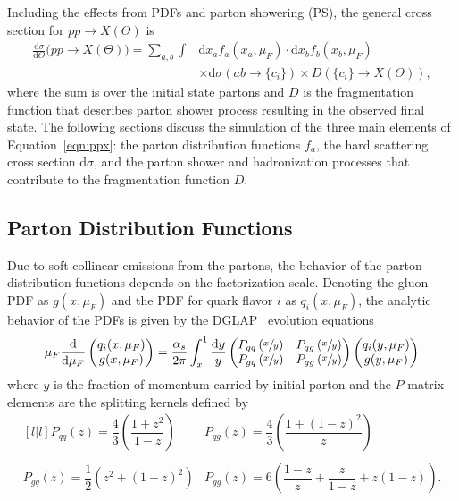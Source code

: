 Including the effects from PDFs and parton showering (PS), the general cross section for $pp \rightarrow X(\Theta)$ is
\begin{align}
  \label{eqn:ppx}
  \frac{\text{d}\sigma}{\text{d}\Theta} \Big(pp \rightarrow X(\Theta) \Big) =
  \sum_{a,b} \int & \text{d} x_a f_a(x_a, \mu_F) \cdot \text{d} x_b f_b(x_b, \mu_F)  \nonumber \\
  & \times \text{d}\sigma \left(ab \rightarrow \{c_i\} \right)
  \times D \left( \{c_i\} \rightarrow X(\Theta) \right), 
\end{align}
where the sum is over the initial state partons and $D$ is the fragmentation function that describes parton shower process resulting in the observed final state.
The following sections discuss the simulation of the three main elements of Equation~\ref{eqn:ppx}: the parton distribution functions $f_a$, the hard scattering cross section $\text{d}\sigma$, and the parton shower and hadronization processes that contribute to the fragmentation function $D$.

\subsection{Parton Distribution Functions}

Due to soft collinear emissions from the partons, the behavior of the parton distribution functions depends on the factorization scale.
Denoting the gluon PDF as $g(x, \mu_F)$ and the PDF for quark flavor $i$ as $q_i(x, \mu_F)$, the analytic behavior of the PDFs is given by the DGLAP~\cite{Dokshitzer1977, Gribov1972, Altarelli1977} evolution equations
\begin{equation}
  \mu_F \frac{\text{d}}{\text{d} \mu_F} \begin{pmatrix} q_i(x, \mu_F) \\ g(x, \mu_F) \end{pmatrix}
  = \frac{\alpha_s}{2\pi} \int_{x}^{1} \frac{\text{d}y}{y}
  \begin{pmatrix}
     P_{qq}\left(\sfrac{x}{y}\right) &  P_{qg}\left(\sfrac{x}{y}\right) \\
     P_{gq}\left(\sfrac{x}{y}\right) &  P_{gg}\left(\sfrac{x}{y}\right) 
  \end{pmatrix}
    \begin{pmatrix} q_i(y, \mu_F) \\ g(y, \mu_F) \end{pmatrix}
\end{equation}
where $y$ is the fraction of momentum carried by initial parton and the $P$ matrix elements are the splitting kernels defined by
\begin{equation}
  \begin{matrix}[l | l]
    P_{qq}(z) = \dfrac{4}{3} \left( \dfrac{1+z^2}{1-z} \right)
    & P_{qg}(z) = \dfrac{4}{3} \left( \dfrac{1+(1-z)^2}{z} \right)
    \\ \\ P_{gq}(z) = \dfrac{1}{2} \left( z^2 + (1+z)^2 \right)
    & P_{gg}(z) = 6 \left( \dfrac{1-z}{z} + \dfrac{z}{1-z} + z(1-z) \right) .
  \end{matrix}
\end{equation}

